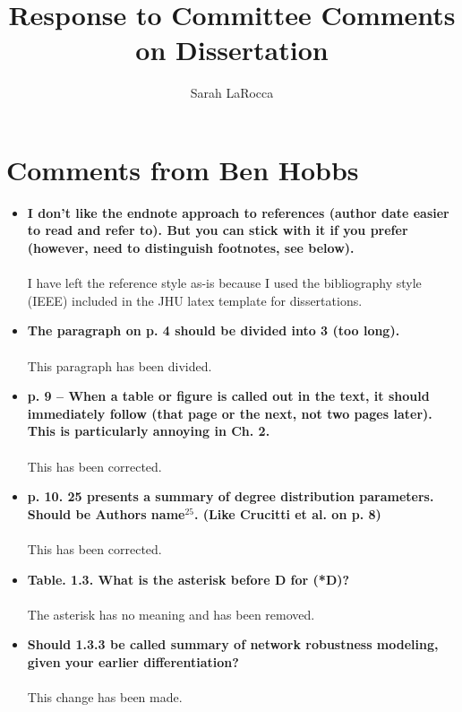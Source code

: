 \documentclass[a4paper,10pt]{article}
\title{Response to Committee Comments on Dissertation}
\author{Sarah LaRocca}
\begin{document}
\maketitle


\section{Comments from Ben Hobbs}

\begin{itemize}
 \item \textbf{I don't like the endnote approach to references (author date easier to read and refer to).  But you can stick with it if you prefer (however, need to distinguish footnotes, see below).}\\
 \\
 I have left the reference style as-is because I used the bibliography style (IEEE) included in the JHU latex template for dissertations.
 
 \item \textbf{The paragraph on p. 4 should be divided into 3 (too long).}\\
 \\
 This paragraph has been divided.

 \item \textbf{p. 9 -- When a table or figure is called out in the text, it should immediately follow (that page or the next, not two pages later).  This is particularly annoying in Ch. 2.}\\
 \\
 This has been corrected.
 
 \item \textbf{p. 10.  25 presents a summary of degree distribution parameters.  Should be Authors name$^{25}$.  (Like Crucitti et al. on p. 8)}\\
 \\
 This has been corrected.
 
 \item \textbf{Table. 1.3.  What is the asterisk before D for (*D)?}\\
 \\
 The asterisk has no meaning and has been removed.
  
 \item \textbf{Should 1.3.3 be called summary of network robustness modeling, given your earlier differentiation?}\\
 \\
 This change has been made. 


\end{itemize}
\end{document}
